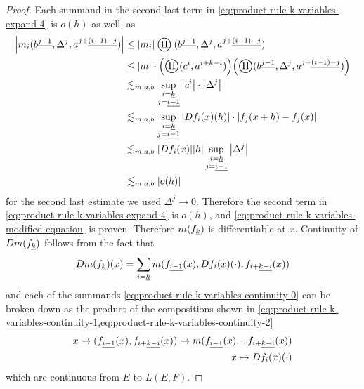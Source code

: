 \documentclass[../main-manifolds.tex]{subfiles}
\begin{document}
\begin{proof}
    Each summand in the second last term in \cref{eq:product-rule-k-variables-expand-4} is $o(h)$ as well, as
    \begin{align}
        \abs{m_i(\UPL{b}[j-1],\Delta^j,\UPL{a}[j+][(i-1)-j])}&\leq\vert m_i\vert\bigoprod(\UPL{b}[j-1],\Delta^j,\UPL{a}[j+][(i-1)-j])\nonumber\\
        &\leq \abs{m}\cdot\qty(\bigoprod(c^i,\UPL{a}[i+][k-i]))\qty(\bigoprod(\UPL{b}[j-1],\Delta^j,\UPL{a}[j+][(i-1)-j]))\nonumber\\
        &\Lsim_{m,a,b}\sup_{\substack{i=\underline{k}\\ j = \underline{i-1}}}\abs{c^i}\cdot\abs{\Delta^j}\nonumber\\
        &\Lsim_{m,a,b}\sup_{\substack{i=\underline{k}\\ j = \underline{i-1}}}\abs{Df_i(x)(h)}\cdot\abs{f_j(x+h) - f_j(x)}\nonumber\\
        &\Lsim_{m,a,b}\abs{Df_i(x)}\abs{h}\sup_{\substack{i=\underline{k}\\ j=\underline{i-1}}}\abs{\Delta^j}\nonumber\\
        &\Lsim_{m,a,b}\abs{o(h)}\label{eq:product-rule-k-variables-second-last-term-o(h)}
    \end{align}
    for the second last estimate we used $\Delta^j\to 0$. Therefore the second term in \cref{eq:product-rule-k-variables-expand-4} is $o(h)$, and \cref{eq:product-rule-k-variables-modified-equation} is proven. Therefore $m(\UL{f}[k])$ is differentiable at $x$. Continuity of $Dm(\UL{f}[k])$ follows from the fact that 
    \begin{equation}\label{eq:product-rule-k-variables-continuity-0}
        Dm(\UL{f}[k])(x) = \sum_{i=\underline{k}}m(\UL{f}[i-1](x),Df_i(x)(\cdot),\UL{f}[i+][k-i](x))
    \end{equation}
    and each of the summands \cref{eq:product-rule-k-variables-continuity-0} can be broken down as the product of the compositions shown in \cref{eq:product-rule-k-variables-continuity-1,eq:product-rule-k-variables-continuity-2}
    \begin{align}
        x\mapsto(\UL{f}[i-1](x),\UL{f}[i+][k-i](x))\mapsto m(\UL{f}[i-1](x),\cdot,\UL{f}[i+][k-i](x))\label{eq:product-rule-k-variables-continuity-1}\\
        x\mapsto Df_i(x)(\cdot)\label{eq:product-rule-k-variables-continuity-2}
    \end{align}
    which are continuous from $E$ to $L(E,F)$.
\end{proof}
\end{document}
